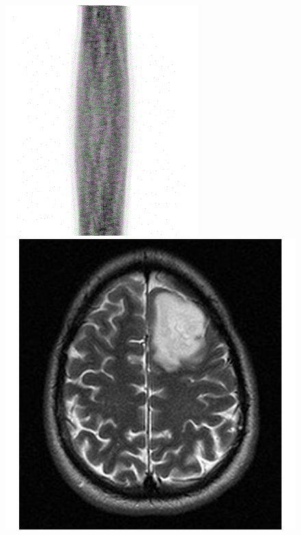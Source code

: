 \begin{frame}

\begin{figure}[!tbp]
  \centering
  \begin{minipage}[b]{0.45\textwidth}
    \includegraphics[width=\textwidth]{Images/sinogram_head.png}
  \end{minipage}
\pause
  \hfill
  \begin{minipage}[b]{0.45\textwidth}
    \includegraphics[width=\textwidth]{Images/brain_tumor.jpg}
  \end{minipage}
\end{figure}
\end{frame}

